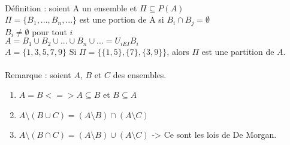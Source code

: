 \paragraph{}
Définition : soient A un ensemble et $\Pi \subseteq P(A)$\\
$\Pi = \{B_1, ..., B_n, ...\}$ est une portion de A si $B_i \cap B_j = \emptyset$\\
$B_i \neq \emptyset$ pour tout $i$\\
$A = B_1 \cup B_2 \cup ... \cup B_n \cup ... = U_{iEI}B_i$\\
$A = \{1,3,5,7,9\}$
Si $\Pi = \{\{1,5\},\{7\},\{3,9\}\}$, alors $\Pi$ est une partition de $A$.\\

\paragraph{}
Remarque : soient $A$, $B$ et $C$ des ensembles.
\begin{enumerate}
	\item $A = B <=> A \subseteq B $ et $ B \subseteq A$
	\item $A \setminus (B \cup C) = (A \setminus B) \cap (A \setminus C)$
	\item $A \setminus (B \cap C) = (A \setminus B) \cup (A \setminus C)$
	-> Ce sont les lois de De Morgan.
\end{enumerate}